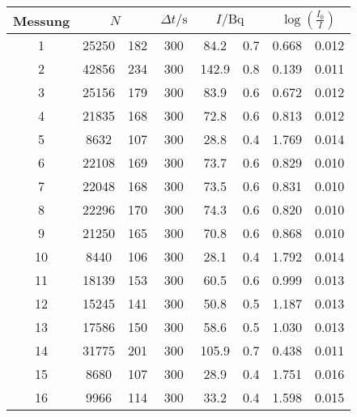 \label{tab:tabWuerfel5}
	\begin{tabular}{cS[table-format=5.0]@{${}\pm{}$}S[table-format=3.0]S[table-format=3.0]S[table-format=3.1]@{${}\pm{}$}S[table-format=1.1]S[table-format=1.3]@{${}\pm{}$}S[table-format=1.3]}
		\toprule
		{Messung} &  & {$\Delta t/\si{\second}$} &  &  \\
		 & 25250 & 182 & 300 & 84.2 & 0.7 & 0.668 & 0.012 \\
		 2 & 42856 & 234 & 300 & 142.9 & 0.8 & 0.139 & 0.011 \\
		 3 & 25156 & 179 & 300 & 83.9 & 0.6 & 0.672 & 0.012 \\
		 4 & 21835 & 168 & 300 & 72.8 & 0.6 & 0.813 & 0.012 \\
		 5 &  8632 & 107 & 300 & 28.8 & 0.4 & 1.769 & 0.014 \\
		 6 & 22108 & 169 & 300 & 73.7 & 0.6 & 0.829 & 0.010 \\
		 7 & 22048 & 168 & 300 & 73.5 & 0.6 & 0.831 & 0.010 \\
		 8 & 22296 & 170 & 300 & 74.3 & 0.6 & 0.820 & 0.010 \\
		 9 & 21250 & 165 & 300 & 70.8 & 0.6 & 0.868 & 0.010 \\
	    10 &  8440 & 106 & 300 & 28.1 & 0.4 & 1.792 & 0.014 \\
	    11 & 18139 & 153 & 300 & 60.5 & 0.6 & 0.999 & 0.013 \\
		12 & 15245 & 141 & 300 & 50.8 & 0.5 & 1.187 & 0.013 \\
		13 & 17586 & 150 & 300 & 58.6 & 0.5 & 1.030 & 0.013 \\
		14 & 31775 & 201 & 300 & 105.9 & 0.7 & 0.438 & 0.011 \\
		15 &  8680 & 107 & 300 & 28.9 & 0.4 & 1.751 & 0.016 \\
		16 &  9966 & 114 & 300 & 33.2 & 0.4 & 1.598 & 0.015 \\
		\bottomrule
	\end{tabular}
